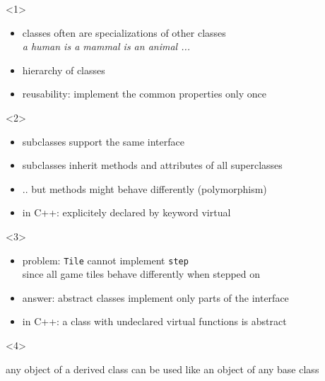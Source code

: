 \documentclass{slides}
\begin{document}
\begin{frame}

  \begin{center}
  \end{center}
  \begin{onlyenv}<1>
    \begin{itemize}
    \item classes often are specializations of other classes\\
      \emph{a human is a mammal is an animal ...}
    \item \alert{hierarchy of classes}
    \item reusability: implement the common properties only once
    \end{itemize}
  \end{onlyenv}
  \begin{onlyenv}<2>
    \begin{itemize}
    \item subclasses support the same interface
    \item subclasses inherit methods and attributes of all superclasses
    \item .. but methods might behave differently
      (\alert{polymorphism})
    \item in C++: explicitely declared by keyword \alert{virtual}
    \end{itemize}
  \end{onlyenv}
  \begin{onlyenv}<3>
    \begin{itemize}
    \item problem: \texttt{Tile} cannot implement \texttt{step}\\
      since  all game tiles behave differently when stepped on
    \item answer: \alert{abstract class}es implement only parts of the interface
    \item in C++: a class with undeclared virtual functions is abstract
    \end{itemize}
  \end{onlyenv}
  \begin{onlyenv}<4>
    \begin{alertbox}{0.75\textwidth}
      any object of a derived class can be used like an object of any
      base class
    \end{alertbox}
  \end{onlyenv}
\end{frame}
\end{document}
